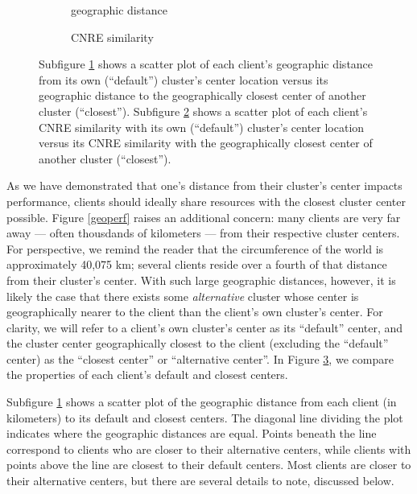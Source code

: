 \begin{figure}
        \begin{subfigure}[b]{0.8\linewidth}
            \caption{geographic distance}
            \label{nearest_center_dist}
        \end{subfigure}
        \begin{subfigure}[b]{0.8\linewidth}
            \caption{CNRE similarity}
            \label{nearest_center_cnre}
        \end{subfigure}
    \caption{Subfigure \ref{nearest_center_dist} shows a scatter plot of each client's geographic distance from its own
    (``default'') cluster's
    center location versus its geographic distance to the geographically closest center of
    another cluster (``closest'').
    Subfigure \ref{nearest_center_cnre} shows a scatter plot of each client's CNRE similarity with its own
    (``default'') cluster's
    center location versus its CNRE similarity with the geographically
    closest center of
    another cluster (``closest'').}
    \label{nearest_centers}
\end{figure}

As we have demonstrated that one's distance from their cluster's center impacts
performance, clients should ideally share resources with the closest cluster
center possible. Figure \ref{geoperf} raises an additional concern: many clients
are very far away --- often thousdands of kilometers --- from their respective
cluster centers.  For perspective, we remind the reader that the circumference of
the world is approximately 40,075 km; several clients reside over a fourth of
that distance from their cluster's center. With such large geographic distances,
however, it is likely the case that there exists some \emph{alternative} cluster
whose center is geographically nearer to the client than the client's own
cluster's center. For clarity, we will refer to a client's own cluster's center
as its ``default'' center, and the cluster center geographically closest to the
client (excluding the ``default'' center) as the ``closest center'' or
``alternative center''. In Figure \ref{nearest_centers}, we compare the
properties of each client's default and closest centers.

Subfigure \ref{nearest_center_dist} shows a scatter plot of the geographic
distance from each client (in kilometers) to its default and closest centers.
The diagonal line dividing the plot indicates where the geographic distances are
equal.  Points beneath the line correspond to clients who are closer to their
alternative centers, while clients with points above the line are closest to
their default centers. Most clients are closer to their alternative centers, but
there are several details to note, discussed below. 

